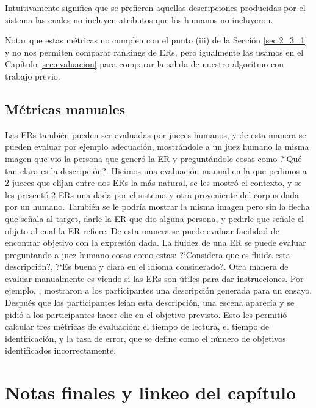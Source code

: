 Intuitivamente significa que se prefieren aquellas descripciones producidas por el sistema las cuales no incluyen atributos que los humanos no incluyeron.

Notar que estas m\'etricas no cumplen con el punto (iii) de la Secci\'on \ref{sec:2_3_1} y no nos permiten comparar rankings de ERs, pero igualmente las usamos en el Cap\'itulo \ref{sec:evaluacion} para comparar la salida de nuestro algoritmo con trabajo previo.

\subsection{M\'etricas manuales}

Las ERs tambi\'en pueden ser evaluadas por jueces humanos, y de esta manera se pueden evaluar por ejemplo adecuaci\'on, mostr\'andole a un juez humano la misma imagen que vio la persona que gener\'o la ER y pregunt\'andole cosas como ?`Qu\'e tan clara es la descripci\'on?.
Hicimos una evaluaci\'on manual en la que pedimos a 2 jueces que elijan entre dos ERs la m\'as natural, se les mostr\'o el contexto, y se les present\'o 2 ERs una dada por el sistema y otra proveniente del corpus dada por un humano. Tambi\'en se le podr\'ia mostrar la misma imagen pero sin la flecha que se\~nala al target, darle la ER que dio alguna persona, y pedirle que se\~nale el objeto al cual la ER refiere. De esta manera se puede evaluar facilidad de encontrar objetivo con la expresi\'on dada.
La fluidez de una ER se puede evaluar preguntando a juez humano cosas como estas: 
?`Considera que es fluida esta descripci\'on?, ?`Es buena y clara en el idioma considerado?. 
Otra manera de evaluar manualmente es viendo si las ERs son \'utiles para dar instrucciones. Por ejemplo, \cite{BelzGattEvaluation}, mostraron a los participantes una descripci\'on generada para un ensayo. Despu\'es que los participantes le\'ian esta descripci\'on, una escena aparec\'ia y se pidi\'o a los participantes
hacer clic en el objetivo previsto. Esto les permiti\'o calcular tres m\'etricas de evaluaci\'on: %
el tiempo de lectura, el tiempo de identificaci\'on, y la tasa de error, que se define como el n\'umero de objetivos identificados incorrectamente.


\section{Notas finales y linkeo del cap\'itulo}
\label{sec:linkeo2}

